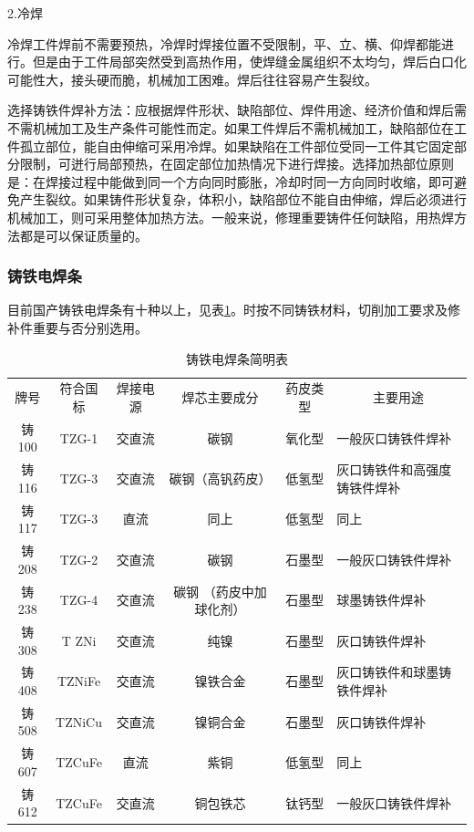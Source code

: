 \documentclass{ctexbook}
\begin{document}
2.冷焊

冷焊工件焊前不需要预热，冷焊时焊接位置不受限制，平、立、横、仰焊都能进行。但是由于工件局部突然受到高热作用，使焊缝金属组织不太均匀，焊后白口化可能性大，接头硬而脆，机械加工困难。焊后往往容易产生裂纹。

选择铸铁件焊补方法：应根据焊件形状、缺陷部位、焊件用途、经济价值和焊后需不需机械加工及生产条件可能性而定。如果工件焊后不需机械加工，缺陷部位在工件孤立部位，能自由伸缩可采用冷焊。如果缺陷在工件部位受同一工件其它固定部分限制，可迸行局部预热，在固定部位加热情况下进行焊接。选择加热部位原则是：在焊接过程中能做到同一个方向同时膨胀，冷却时同一方向同时收缩，即可避免产生裂纹。如果铸件形状复杂，体积小，缺陷部位不能自由伸缩，焊后必须进行机械加工，则可采用整体加热方法。一般来说，修理重要铸件任何缺陷，用热焊方法都是可以保证质量的。
\subsubsection{铸铁电焊条}
目前国产铸铁电焊条有十种以上，见表\ref{tab:zhutiedianhantiao}。时按不同铸铁材料，切削加工要求及修补件重要与否分别选用。
\begin{table}[htbp]
	\centering
	\caption{铸铁电焊条简明表}
	\begin{tabular}{cccccl}
		牌号    & 符合国标  & 焊接电源  & 焊芯主要成分 & 药皮类型  & \multicolumn{1}{c}{主要用途} \\
		铸100  & TZG-1 & 交直流   & 碳钢    & 氧化型   & 一般灰口铸铁件焊补 \\
		铸116  & TZG-3 & 交直流   & 碳钢（高钒药皮） & 低氢型   & 灰口铸铁件和高强度铸铁件焊补 \\
		铸117  & TZG-3 & 直流    & 同上    & 低氢型   & 同上 \\
		铸208  & TZG-2 & 交直流   & 碳钢    & 石墨型   & 一般灰口铸铁件焊补 \\
		铸238  & TZG-4 & 交直流   & 碳钢 （药皮中加球化剂） & 石墨型   & 球墨铸铁件焊补 \\
		铸308  & T ZNi & 交直流   & 纯镍    & 石墨型   & 灰口铸铁件焊补 \\
		铸408  & TZNiFe & 交直流   & 镍铁合金  & 石墨型   & 灰口铸铁件和球墨铸铁件焊补 \\
		铸508  & TZNiCu & 交直流   & 镍铜合金  & 石墨型   & 灰口铸铁件焊补 \\
		铸607  & TZCuFe & 直流    & 紫铜    & 低氢型   & 同上 \\
		铸612  & TZCuFe & 交直流   & 铜包铁芯  & 钛钙型   & 一般灰口铸铁件焊补 \\
	\end{tabular}%
	\label{tab:zhutiedianhantiao}%
\end{table}%
\end{document}
